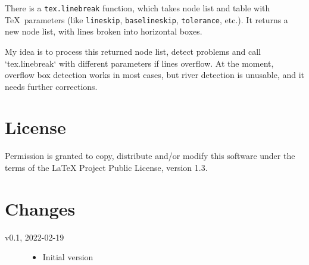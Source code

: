 \documentclass{l3doc}
\begin{document}
There is a \verb|tex.linebreak| function, which takes
node list and table with \TeX\ parameters (like \verb|lineskip|, \verb|baselineskip|, \verb|tolerance|,
etc.). It returns a new node list, with lines broken into horizontal boxes.

My idea is to process this returned node list, detect problems and call
`tex.linebreak` with different parameters if lines overflow. At the
moment, overflow box detection works in most cases, but river detection is unusable, and it needs further corrections.

\section{License}

Permission is granted to copy, distribute and/or modify this software
under the terms of the LaTeX Project Public License, version 1.3.

\section{Changes}

\begin{description}
  \item[v0.1, 2022-02-19]
    \begin{itemize}
      \item Initial version
    \end{itemize}
\end{description}
\end{document}
